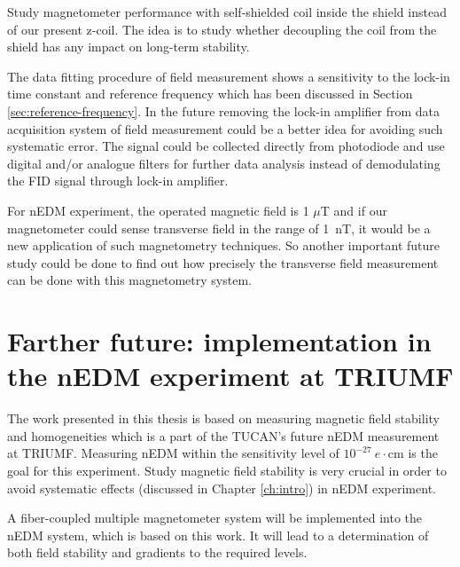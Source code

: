 Study magnetometer performance with self-shielded coil inside the shield instead of our present z-coil. The idea  is to study whether decoupling the coil from the shield has any impact on long-term stability.

The data fitting procedure of field measurement shows a sensitivity to the lock-in time constant and reference frequency which has been discussed in Section \ref{sec:reference-frequency}.  In the future removing the lock-in amplifier from data  acquisition system of field measurement could be a better idea for avoiding such systematic error. The signal could be collected directly from photodiode and use digital and/or analogue filters for further data analysis  instead of demodulating the FID signal through lock-in amplifier.          

For nEDM experiment, the operated magnetic field is 1 $\mu$T and if our magnetometer could sense transverse field in the range of 1~nT, it would be a new application of such magnetometry techniques. So another important future study could be done to find out how precisely the transverse field measurement can be done with
this magnetometry system. 
 



\section{Farther future:  implementation in the nEDM experiment at TRIUMF}

The work presented in this thesis is based on measuring magnetic field stability and homogeneities which is a part of the TUCAN's future nEDM measurement at TRIUMF. Measuring nEDM within the sensitivity level of $10^{-27}~e\cdot$cm is the goal for this experiment. Study magnetic field stability is very crucial in order to avoid systematic effects (discussed in Chapter \ref{ch:intro}) in nEDM experiment. %

A fiber-coupled multiple magnetometer system will be implemented into the nEDM system, which is based on this work.  It will lead to a determination of both field stability and gradients to the required levels.



